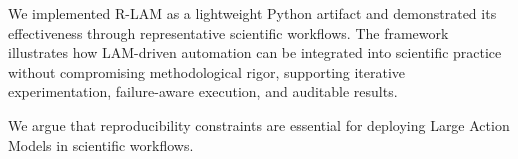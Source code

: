 \documentclass[conference]{IEEEtran}
\begin{document}
We implemented R-LAM as a lightweight Python artifact and demonstrated its effectiveness through representative scientific workflows. The framework illustrates how LAM-driven automation can be integrated into scientific practice without compromising methodological rigor, supporting iterative experimentation, failure-aware execution, and auditable results.

We argue that reproducibility constraints are essential for deploying Large Action Models in scientific workflows.



\end{document}
